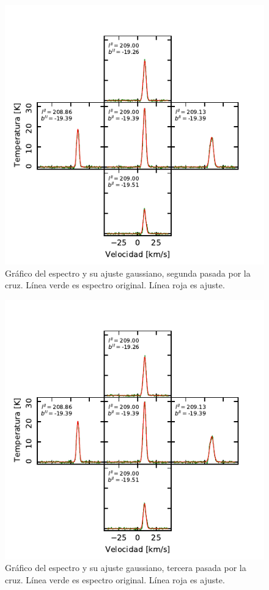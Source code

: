 \begin{figure}[p]
	\centering
	\includegraphics{specfit2.pdf}
	\caption{Gráfico del espectro y su ajuste gaussiano, segunda pasada por la cruz. Línea verde es espectro original. Línea roja es ajuste.}
	\label{fig:specfit2}
\end{figure}

\begin{figure}[p]
	\centering
	\includegraphics{specfit3.pdf}
	\caption{Gráfico del espectro y su ajuste gaussiano, tercera pasada por la cruz. Línea verde es espectro original. Línea roja es ajuste.}
	\label{fig:specfit3}
\end{figure}

